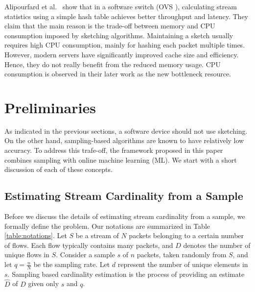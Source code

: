 	Alipourfard et al.\ \cite{alipourfard2015re} show that in a software switch (OVS \cite{pfaff2015design}), calculating stream statistics using a simple hash table achieves better throughput and latency. They claim that the main reason is the trade-off between memory and CPU consumption imposed by sketching algorithms. Maintaining a sketch usually requires high CPU consumption, mainly for hashing each packet multiple times. However, modern servers have significantly improved cache size and efficiency. Hence, they do not really benefit from the reduced memory usage. CPU consumption is observed in their later work \cite{alipourfard2018comparison} as the new bottleneck resource.
	
	
\section{Preliminaries} \label{sec:perliminaries}
	
	As indicated in the previous sections, a software device should not use sketching. On the other hand, sampling-based algorithms are known to have relatively low accuracy. To address this trafe-off, the framework proposed in this paper combines sampling with online machine learning (ML). We start with a short discussion of each of these concepts.
	
	\subsection{Estimating Stream Cardinality from a Sample} \label{subsec:sampling}
	
		Before we discuss the details of estimating stream cardinality from a sample, we formally define the problem. Our notations are summarized in Table \ref{table:notations}. Let $S$ be a stream of $N$ packets belonging to a certain number of flows. Each flow typically contains many packets, and $D$ denotes the number of unique flows in $S$. Consider a sample $s$ of $n$ packets, taken randomly from $S$, and let $q=\frac{n}{N}$ be the sampling rate. Let $d$ represent the number of unique elements in $s$. Sampling based cardinality estimation is the process of providing an estimate $\hat{D}$ of $D$ given only $s$ and $q$.
		
